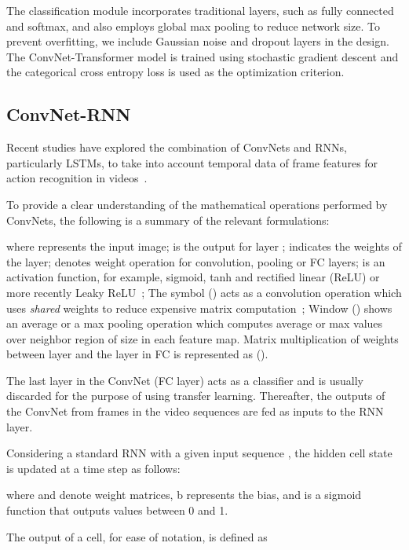 \documentclass[fleqn,10pt]{wlscirep}
\begin{document}
The classification module incorporates traditional layers, such as fully connected and softmax, and also employs global max pooling to reduce network size. To prevent overfitting, we include Gaussian noise and dropout layers in the design. The ConvNet-Transformer model is trained using stochastic gradient descent and the categorical cross entropy loss is used as the optimization criterion.
\subsection{ConvNet-RNN}
\label{sec:convrnn}




Recent studies have explored the combination of ConvNets and RNNs, particularly LSTMs, to take into account temporal data of frame features for action recognition in videos~\cite{donahue2015long,yue2015beyond,ullah2017action,he2021db,ullah2018action,chen2021lstm}.

To provide a clear understanding of the mathematical operations performed by ConvNets, the following is a summary of the relevant formulations:

where  represents the input image;  is the output for layer ;  indicates the weights of the layer;  denotes weight operation for convolution, pooling or FC layers;  is an activation function, for example, sigmoid, tanh and rectified linear (ReLU) or more recently Leaky ReLU~\cite{maas2013rectifier}; The symbol () acts as a convolution operation which uses \textit{shared} weights to reduce expensive matrix computation~\cite{lecun2010convolutional}; Window () shows an average or a max pooling operation which computes average or max values over neighbor region of size  in each feature map. Matrix multiplication of weights between layer  and the layer  in FC is represented as ().

The last layer in the ConvNet (FC layer) acts as a classifier and is usually discarded for the purpose of using transfer learning. Thereafter, the outputs of the ConvNet from frames in the video sequences are fed as inputs to the RNN layer.

Considering a standard RNN with a given input sequence , the hidden cell state is updated at a time step  as follows:

where  and  denote weight matrices, b represents the bias, and  is a sigmoid function that outputs values between 0 and 1.

The output of a cell, for ease of notation, is defined as 
\end{document}
